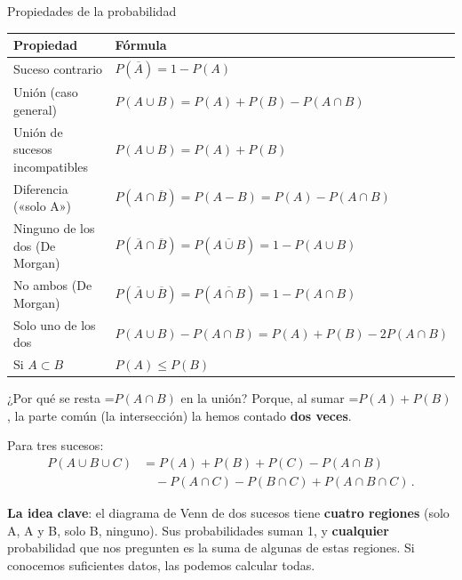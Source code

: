 \documentclass[11pt,a4paper]{article}
\newcommand{\fmm}[1]{\setbox0=\hbox{$#1$}\ifdim\wd0>\linewidth\[#1\]\else\mbox{\box0}\fi}
\newcommand{\fmuline}[1]{\textbf{\color{fmaccent}#1}}
\begin{document}
  
\begin{fmprop}{Propiedades de la probabilidad}
\begin{center}\renewcommand{\arraystretch}{1.7}\small\begin{tabularx}{\linewidth}{>{\raggedright\arraybackslash}p{5.2cm}>{\centering\arraybackslash}X}\toprule
\textbf{Propiedad} & \textbf{Fórmula}\\\midrule
Suceso contrario & $P(\overline{A})=1-P(A)$\\[3pt]
Unión (caso general) & $P(A\cup B)=P(A)+P(B)-P(A\cap B)$\\[3pt]
Unión de sucesos incompatibles & $P(A\cup B)=P(A)+P(B)$\\[3pt]
Diferencia («solo A») & $P(A\cap\overline{B})=P(A-B)=P(A)-P(A\cap B)$\\[3pt]
Ninguno de los dos (De Morgan) & $P(\overline{A}\cap\overline{B})=P(\overline{A\cup B})=1-P(A\cup B)$\\[3pt]
No ambos (De Morgan) & $P(\overline{A}\cup\overline{B})=P(\overline{A\cap B})=1-P(A\cap B)$\\[3pt]
Solo uno de los dos & $P(A\cup B)-P(A\cap B)=P(A)+P(B)-2P(A\cap B)$\\[3pt]
Si $A\subset B$ & $P(A)\leq P(B)$\\[3pt]
\bottomrule\end{tabularx}\end{center}

      

¿Por qué se resta \fmm{P(A\cap B)} en la unión? Porque, al sumar \fmm{P(A)+P(B)}, la parte común (la intersección) la hemos contado \textbf{dos veces}.

      

Para tres sucesos: 
\[\begin{aligned}P(A\cup B\cup C)&=P(A)+P(B)+P(C)-P(A\cap B)\\&\quad-P(A\cap C)-P(B\cap C)+P(A\cap B\cap C)\,.\end{aligned}\]


      
\begin{fmnote}\fmuline{La idea clave}: el diagrama de Venn de dos sucesos tiene \textbf{cuatro regiones} (solo A, A y B, solo B, ninguno). Sus probabilidades suman 1, y \textbf{cualquier} probabilidad que nos pregunten es la suma de algunas de estas regiones. Si conocemos suficientes datos, las podemos calcular todas.\end{fmnote}
\end{fmprop}
\end{document}
